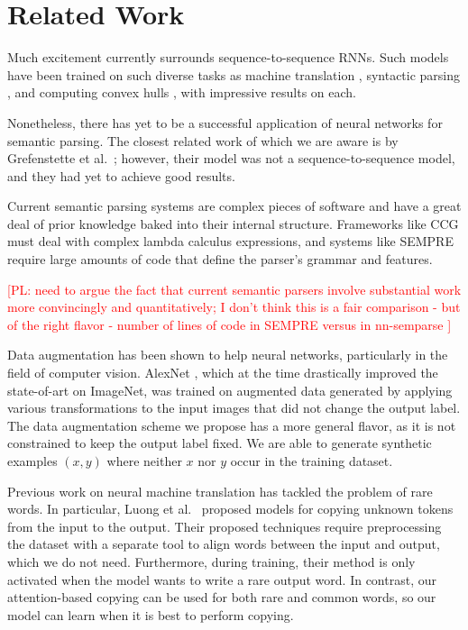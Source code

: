 \documentclass[11pt,letterpaper]{article}
\newcommand\pl[1]{\textcolor{red}{[PL: #1]}}
\begin{document}
\section{Related Work}
Much excitement currently surrounds sequence-to-sequence RNNs.
Such models have been trained on such diverse tasks as
machine translation \cite{sutskever2014sequence,bahdanau2014neural}, 
syntactic parsing \cite{vinyals2015grammar}, and 
computing convex hulls \cite{vinyals2015pointer}, 
with impressive results on each.

Nonetheless, there has yet to be a successful application of
neural networks for semantic parsing.
The closest related work of which we are aware is
by Grefenstette et al.~;
however, their model was not a sequence-to-sequence model,
and they had yet to achieve good results.

Current semantic parsing systems are complex pieces of software 
and have a great deal of prior knowledge baked into their internal structure.
Frameworks like CCG must deal with complex lambda calculus expressions,
and systems like SEMPRE \cite{berant2013freebase}
require large amounts of code that define the parser's grammar and features.

\pl{need to argue the fact that current semantic parsers involve substantial
  work more convincingly and quantitatively;
  I don't think this is a fair comparison - but of the right flavor - number of lines
  of code in SEMPRE versus in nn-semparse
}

Data augmentation has been shown to help neural networks,
particularly in the field of computer vision.
AlexNet \cite{krizhevsky2012imagenet}, 
which at the time drastically improved
the state-of-art on ImageNet,
was trained on augmented data generated by applying various transformations
to the input images that did not change the output label.
The data augmentation scheme we propose has a more general flavor,
as it is not constrained to keep the output label fixed.
We are able to generate synthetic examples $(x, y)$
where neither $x$ nor $y$ occur in the training dataset.

Previous work on neural machine translation has
tackled the problem of rare words.
In particular, Luong et al.~
proposed models for copying unknown
tokens from the input to the output.
Their proposed techniques require preprocessing the dataset
with a separate tool to align words between the input and output,
which we do not need.
Furthermore, during training, their method is only activated when the model
wants to write a rare output word. 
In contrast, our attention-based copying can be used for 
both rare and common words,
so our model can learn when it is best to perform copying.
\end{document}

